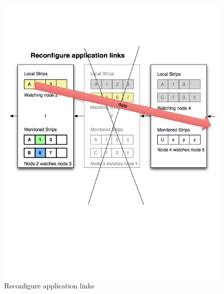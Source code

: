 \begin{figure}[h!]
\caption{Reconfigure application links}
\label{fig:strip7}
\centering
    \includegraphics[width=\linewidth]{figures/strip7}
\end{figure}

